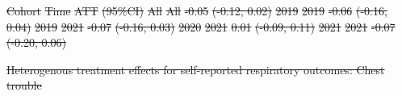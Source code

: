 \documentclass[
  letterpaper,
  DIV=11,
  numbers=noendperiod]{scrartcl}
\makeatletter
\renewenvironment{table}%
   {\renewcommand\familydefault\sfdefault
    \@float{table}}
   {\end@float}
\providecommand{\DIFdeltex}[1]{{\protect\color{red}\sout{#1}}}                      %
\providecommand{\DIFdelFL}[1]{\DIFdel{#1}} %
\providecommand{\DIFdel}[1]{\texorpdfstring{\DIFdeltex{#1}}{}} %
\makeatother
\begin{document}
\DIFdelFL{Cohort }%
\DIFdelFL{Time }%
\DIFdelFL{ATT }%
\DIFdelFL{(95\%CI)}%
\DIFdelFL{All }%
\DIFdelFL{All }%
\DIFdelFL{-0.05 }%
\DIFdelFL{(-0.12, 0.02)}%
\DIFdelFL{2019 }%
\DIFdelFL{2019 }%
\DIFdelFL{-0.06 }%
\DIFdelFL{(-0.16, 0.04)}%
\DIFdelFL{2019 }%
\DIFdelFL{2021 }%
\DIFdelFL{-0.07 }%
\DIFdelFL{(-0.16, 0.03)}%
\DIFdelFL{2020 }%
\DIFdelFL{2021 }%
\DIFdelFL{0.01 }%
\DIFdelFL{(-0.09, 0.11)}%
\DIFdelFL{2021 }%
\DIFdelFL{2021 }%
\DIFdelFL{-0.07 }%
\DIFdelFL{(-0.20, 0.06)}%

{%
\DIFdelFL{Heterogenous treatment effects for self-reported respiratory outcomes:
Chest trouble }}%
\end{document}

